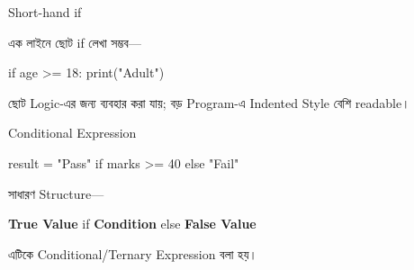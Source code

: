 \noindent
\begin{minipage}[t]{0.49\linewidth}

\begin{sideexamplebox}{Short-hand \textenglish{\ttfamily if}}

এক লাইনে ছোট
\textenglish{\ttfamily if}
লেখা সম্ভব—

\begin{sidecodebox}
\begin{english}
\ttfamily
if age >= 18: print("Adult")
\end{english}
\end{sidecodebox}

ছোট Logic-এর জন্য ব্যবহার করা যায়; বড় Program-এ Indented
Style বেশি readable।

\end{sideexamplebox}

\end{minipage}
\hfill
\begin{minipage}[t]{0.49\linewidth}

\begin{sideexamplebox}{Conditional Expression}

\begin{sidecodebox}
\begin{english}
\ttfamily
result = "Pass" if marks >= 40 else "Fail"
\end{english}
\end{sidecodebox}

সাধারণ Structure—

\begin{center}
\textbf{True Value}
\textenglish{\ttfamily if}
\textbf{Condition}
\textenglish{\ttfamily else}
\textbf{False Value}
\end{center}

এটিকে Conditional/Ternary Expression বলা হয়।

\end{sideexamplebox}

\end{minipage}



